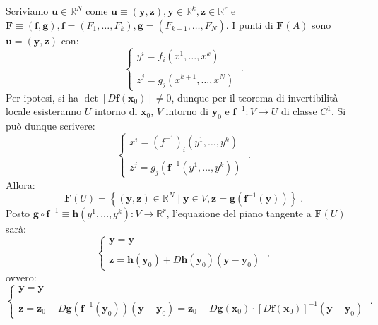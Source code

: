 \documentclass[a4paper,12pt]{report}
\theoremstyle{plain}
\theoremstyle{definition}
\theoremstyle{remark}
\numberwithin{equation}{section}
\begin{document}
\proof Scriviamo $\mathbf{u}\in\mathbb{R}^N$ come $\mathbf{u}\equiv(\mathbf{y},\mathbf{z}), \mathbf{y}\in\mathbb{R}^k,\mathbf{z}\in\mathbb{R}^r$ e $\mathbf{F}\equiv(\mathbf{f},\mathbf{g}), \mathbf{f}=(F_1,\ldots,F_k), \mathbf{g}=(F_{k+1},\ldots,F_N)$. I punti di $\mathbf{F}(A)$ sono $\mathbf{u}=(\mathbf{y},\mathbf{z})$ con:
\begin{equation}
\begin{cases}
 y^i=f_i(x^1,\ldots,x^k) \\
\\
z^j=g_j(x^{k+1},\ldots,x^N)
\end{cases}\;.
\end{equation}
Per ipotesi, si ha $\det[D\mathbf{f}(\mathbf{x}_0)]\ne 0$, dunque per il teorema di invertibilità locale esisteranno $U$ intorno di $
\mathbf{x}_0$, $V$ intorno di $\mathbf{y}_0$ e $\mathbf{f}^{-1}:V\to U$ di classe $C^1$. Si può dunque scrivere:
\begin{equation}
\begin{cases}
 x^i=(f^{-1})_i(y^1,\ldots,y^k) \\
\\
z^j=g_j(\mathbf{f}^{-1}(y^1,\ldots,y^k))
\end{cases}\;.
\end{equation}
Allora:
\begin{equation}
\mathbf{F}(U)=\left\{(\mathbf{y},\mathbf{z})\in\mathbb{R}^N\;|\;\mathbf{y}\in V, \mathbf{z}=\mathbf{g}(\mathbf{f}^{-1}(\mathbf{y}))\right\}\;.
\end{equation}
Posto $\mathbf{g}\circ\mathbf{f}^{-1}\equiv \mathbf{h}(y^1,\ldots,y^k):V\to\mathbb{R}^r$, l'equazione del piano tangente a $\mathbf{F}(U)$ sarà:
\begin{equation}
\begin{cases}
 \mathbf{y}=\mathbf{y} \\
\\
\mathbf{z}=\mathbf{h}(\mathbf{y}_0)+D\mathbf{h}(\mathbf{y}_0)(\mathbf{y}-\mathbf{y}_0)
\end{cases}\;,
\end{equation}
ovvero:
\begin{equation}
\begin{cases}
\mathbf{y}=\mathbf{y} \\
\\
 \mathbf{z}=\mathbf{z}_0+D\mathbf{g}(\mathbf{f}^{-1}(\mathbf{y}_0))(\mathbf{y}-\mathbf{y}_0)=\mathbf{z}_0+D\mathbf{g}(\mathbf{x}_0)\cdot[D\mathbf{f}(\mathbf{x}_0)]^{-1}(\mathbf{y}-\mathbf{y}_0)
\end{cases}\;.
\end{equation}
\end{document}
